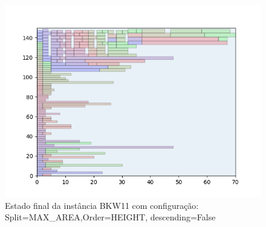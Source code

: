 \begin{figure}[H]
    \centering
    \caption[]{Estado final da instância BKW11 com configuração: Split=MAX_AREA,Order=HEIGHT, descending=False}
    \label{fig:bkw11-max_area-height-false}
    \includegraphics[scale=0.5]{output/figures/bkw/bkw11/max_area/height/false/000}
\end{figure}